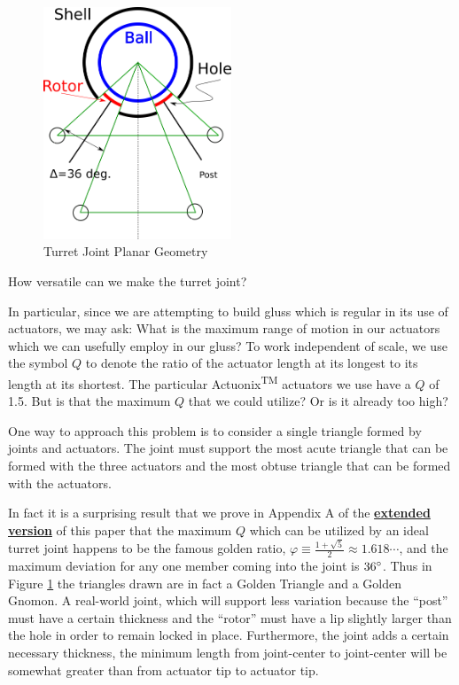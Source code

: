 \documentclass[11pt]{article}
\begin{document}
\begin{figure}[!ht]
  \centering
  \includegraphics[width=0.5\textwidth]{figureslowres/SimplifiedConstraintDrawing.png}
    \caption[Turret Joint Planar Geometry]{Turret Joint Planar Geometry}
      \label{simplified-constraint-drawing}
\end{figure}

How versatile can we make the turret joint?

In particular, since we are attempting to build gluss which is regular in its use of actuators, we may ask:
What is the maximum range of motion in our
actuators which we can usefully employ in our gluss?
To work independent of scale, we use the symbol $Q$ to denote the ratio of the actuator length at its
longest to its length at its shortest.
The particular Actuonix\textsuperscript{TM} actuators
we use have a $Q$ of 1.5. But is that the maximum $Q$ that we could utilize? Or is
it already too high?

One way to approach this problem is to consider a single triangle formed by joints and actuators.
The joint must support the most acute triangle
that can be formed with the three actuators and the most obtuse triangle that can be formed with the actuators.

In fact it is a surprising result that we prove in Appendix A of the
\textbf{\href{https://github.com/PubInv/gluss/blob/gh-pages/doc/Gluss.pdf}{extended version}} of this paper
that the maximum $Q$ which can be utilized
by an ideal turret joint happens to be
the famous golden ratio, $\varphi \equiv \frac{1 + \sqrt{5}}{2} \approx 1.618 \cdots$,
and the maximum deviation for any one member coming
into the joint is $36\degree$.
Thus in Figure \ref{simplified-constraint-drawing} the triangles drawn are in fact a Golden Triangle and a Golden Gnomon.
A real-world joint, which will support less variation because the ``post'' must have a
certain thickness and the ``rotor'' must have a lip
slightly larger than the hole in order to remain locked in place.
Furthermore, the joint adds a certain necessary thickness, the minimum length
 from joint-center to joint-center will be somewhat greater than from actuator tip to actuator tip.
\end{document}
